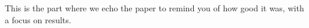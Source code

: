 This is the part where we echo the paper to remind you of how good it was,
with a focus on results.
